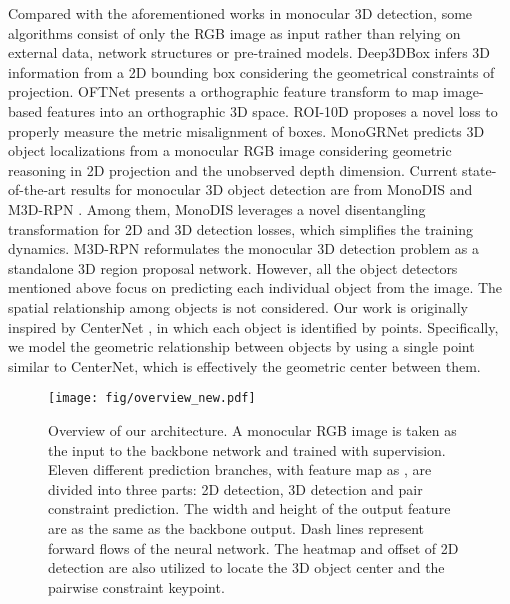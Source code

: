 \documentclass[10pt,twocolumn,letterpaper]{article}
\begin{document}
Compared with the aforementioned works
in monocular 3D detection,  some algorithms consist of only the RGB image as input rather than relying on external data, network structures or  pre-trained models.
Deep3DBox \cite{mousavian_3d_2017} infers 3D information from a 2D bounding box considering the geometrical constraints of projection.
OFTNet \cite{roddick2018orthographic} presents a orthographic feature transform to map image-based features into an orthographic 3D space.
ROI-10D \cite{manhardt_roi_10d_2018} proposes a novel loss to properly measure the metric misalignment of boxes.
MonoGRNet \cite{qin_monogrnet_2018} predicts 3D object localizations from a monocular RGB image considering geometric reasoning in 2D projection and the unobserved depth dimension.
Current state-of-the-art results for monocular 3D object detection are from MonoDIS \cite{simonelli_disentangling_2019} and M3D-RPN \cite{brazil_m3d_rpn_2019}. Among them, MonoDIS \cite{simonelli_disentangling_2019} leverages a novel disentangling transformation for 2D and 3D detection losses, which simplifies the training dynamics.
M3D-RPN \cite{brazil_m3d_rpn_2019} reformulates the monocular 3D detection problem as a standalone 3D region proposal network.
However, all the object detectors mentioned above focus on predicting each individual object from the image. The spatial relationship among objects is not considered.
Our work is originally inspired by CenterNet \cite{zhou_objects_2019}, in which each object is identified by points.
Specifically, we model the geometric relationship between objects by using a single point similar to CenterNet, which is effectively the geometric center between them.


\begin{figure*}[!ht]
	\begin{center}
\texttt{[image: fig/overview\_new.pdf]}
	\end{center}
\caption{Overview of our architecture. A monocular RGB image is taken as the input to the backbone network and trained with supervision. Eleven different prediction branches, with feature map as , are divided into three parts: 2D detection, 3D detection and pair constraint prediction.
The width and height of the output feature  are as the same as the backbone output.
	Dash lines represent forward flows of the neural network. The heatmap and offset of 2D detection are also utilized to locate the 3D object center and the pairwise constraint keypoint.
}
	\label{fig:overview}
\end{figure*}
\end{document}
